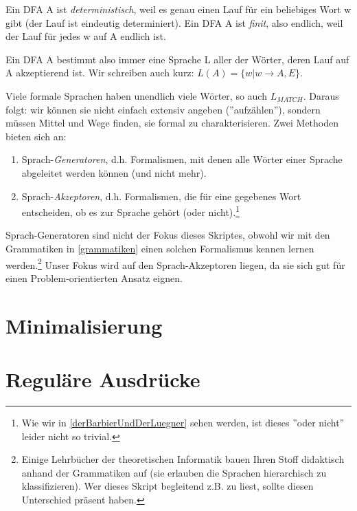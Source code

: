 Ein DFA A ist \emph{deterministisch}, weil es genau einen Lauf
für ein beliebiges Wort w gibt (der Lauf ist eindeutig determiniert).
Ein DFA A ist \emph{finit}, also endlich, weil der Lauf für jedes w auf A endlich ist.

Ein DFA A bestimmt also immer eine Sprache L aller der Wörter,
deren Lauf auf A akzeptierend ist.
Wir schreiben auch kurz: $L(A) = \{w|w \rightarrow A,E\}$.


Viele formale Sprachen haben unendlich viele Wörter,
so auch $L_{MATCH}$.
Daraus folgt: wir können sie nicht einfach extensiv angeben (''aufzählen''),
sondern müssen Mittel und Wege finden, sie formal zu charakterisieren.
Zwei Methoden bieten sich an:
\begin{enumerate}
    \item Sprach-\emph{Generatoren}, d.h. Formalismen,
        mit denen alle Wörter einer Sprache abgeleitet werden können
        (und nicht mehr).
    \item Sprach-\emph{Akzeptoren}, d.h. Formalismen,
        die für eine gegebenes Wort entscheiden,
        ob es zur Sprache gehört (oder nicht).\footnote{
            Wie wir in \autoref{derBarbierUndDerLuegner} sehen werden,
            ist dieses ''oder nicht'' leider nicht so trivial.}
\end{enumerate}

Sprach-Generatoren sind nicht der Fokus dieses Skriptes, obwohl wir mit den Grammatiken
in \autoref{grammatiken} einen solchen Formalismus kennen lernen werden.\footnote{
Einige Lehrbücher der theoretischen Informatik bauen Ihren Stoff didaktisch anhand der Grammatiken
auf (sie erlauben die Sprachen hierarchisch zu klassifizieren).
Wer dieses Skript begleitend z.B. zu \cite{schoening} liest,
sollte diesen Unterschied präsent haben.}
Unser Fokus wird auf den Sprach-Akzeptoren liegen,
da sie sich gut für einen Problem-orientierten Ansatz eignen.


\section{Minimalisierung}
\section{Reguläre Ausdrücke}
